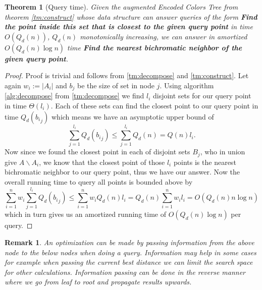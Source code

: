 \documentclass{article}
\newtheorem{theorem}{Theorem}
\newtheorem{remark}{Remark}
\newtheorem{proof}{Proof}
\begin{document}
\begin{theorem}[Query time]\label{tm:query}
Given the augmented Encoded Colors Tree from theorem \ref{tm:construct} whose data structure can answer queries of the form {\bf Find the point inside this set that is closest to the given query point} in time $O\left(Q_d(n)\right)$, $Q_d(n)$ monotonically increasing, we can answer in amortized $O\left(Q_d(n) \log n\right)$ time {\bf Find the nearest bichromatic neighbor of the given query point}.
\end{theorem}
\begin{proof}
Proof is trivial and follows from \ref{tm:decompose} and \ref{tm:construct}.
Let again $w_i := |A_i|$ and $b_j$ be the size of set in node $j$.
Using algorithm \ref{alg:decompose} from \ref{tm:decompose} we find $l_i$ disjoint sets for our query point in time $\Theta\left(l_i\right)$.
Each of these sets can find the closest point to our query point in time $Q_d\left({b_i}_j\right)$ which means we have an asymptotic upper bound of
$$ \sum\limits_{j = 1}^{l_i} Q_d\left({b_i}_j\right) \leq \sum\limits_{j = 1}^{l_i}Q_d\left(n\right) = Q\left(n\right)l_i. $$
Now since we found the closest point in each of disjoint sets $B_j$, who in union give $A\backslash A_i$, we know that the closest point of those $l_i$ points is the nearest bichromatic neighbor to our query point, thus we have our answer.
Now the overall running time to query all points is bounded above by
$$ \sum\limits_{i = 1}^n w_i \sum\limits_{j = 1}^{l_i} Q_d\left({b_i}_j\right)
    \leq \sum\limits_{i = 1}^n w_iQ_d\left(n\right)l_i = Q_d\left(n\right) \sum\limits_{i = 1}^n w_il_i = O\left(Q_d(n)n\log n\right) $$
which in turn gives us an amortized running time of $O\left(Q_d(n)\log n\right)$ per query.
\end{proof}

\begin{remark}
An optimization can be made by passing information from the above node to the below nodes when doing a query.
Information may help in some cases for example when passing the current best distance we can limit the search space for other calculations.
Information passing can be done in the reverse manner where we go from leaf to root and propagate results upwards.
\end{remark}
\end{document}
